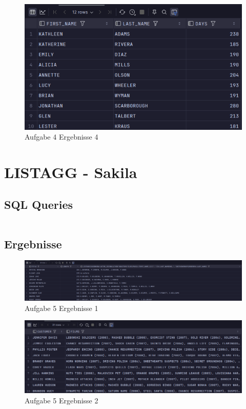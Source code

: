\documentclass[12pt]{scrartcl}
\begin{document}
\begin{figure}[H]
	\centering
	\includegraphics[width=1\linewidth]{../ue3_4_3b.png}
	\caption{Aufgabe 4 Ergebnisse 4}
\end{figure}

\pagebreak

\section{LISTAGG - Sakila}

\subsection{SQL Queries}

\inputminted{sql}{../ue3_5.sql}

\subsection{Ergebnisse}

\begin{figure}[H]
	\centering
	\includegraphics[width=1\linewidth]{../ue3_5_1.png}
	\caption{Aufgabe 5 Ergebnisse 1}
\end{figure}

\begin{figure}[H]
	\centering
	\includegraphics[width=1\linewidth]{../ue3_5_2.png}
	\caption{Aufgabe 5 Ergebnisse 2}
\end{figure}
\end{document}
